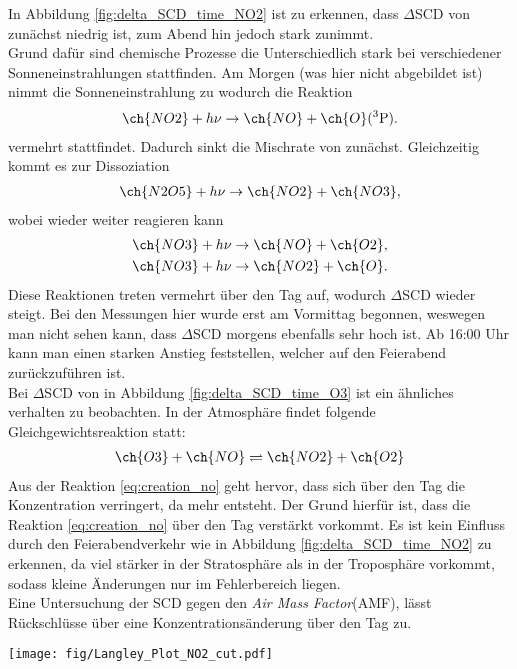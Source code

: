 \documentclass[12pt, a4paper, bibliography=totoc]{scrartcl}
\begin{document}
\begin{multicols}{2}
In Abbildung \ref{fig:delta_SCD_time_NO2} ist zu erkennen, dass $\Delta$SCD von  zunächst niedrig ist, zum Abend hin jedoch stark zunimmt.\\
Grund dafür sind chemische Prozesse die Unterschiedlich stark bei verschiedener Sonneneinstrahlungen stattfinden.
Am Morgen (was hier nicht abgebildet ist) nimmt die Sonneneinstrahlung zu wodurch die Reaktion
\begin{align}
    \ch{NO2} + h \nu \to \ch{NO} + \ch{O} (^3\text{P}). \label{eq:creation_no}
\end{align}
vermehrt stattfindet.
Dadurch sinkt die Mischrate von  zunächst.
Gleichzeitig kommt es zur Dissoziation 
\begin{align}
    \ch{N2O5} + h\nu \to \ch{NO2} + \ch{NO3},
\end{align}
wobei  wieder weiter reagieren kann
\begin{align}
    \ch{NO3} + h\nu \to \ch{NO} + \ch{O2}, \\
    \ch{NO3} + h\nu \to \ch{NO2} + \ch{O}.
\end{align}
Diese Reaktionen treten vermehrt über den Tag auf, wodurch $\Delta$SCD wieder steigt. 
Bei den Messungen hier wurde erst am Vormittag begonnen, weswegen man nicht sehen kann, dass $\Delta$SCD morgens ebenfalls sehr hoch ist.
Ab 16:00 Uhr kann man einen starken Anstieg feststellen, welcher auf den Feierabend zurückzuführen ist.\\
Bei $\Delta$SCD von  in Abbildung \ref{fig:delta_SCD_time_O3} ist ein ähnliches verhalten zu beobachten.
In der Atmosphäre findet folgende Gleichgewichtsreaktion statt:
\begin{align}
    \ch{O3} + \ch{NO} \rightleftharpoons \ch{NO2} + \ch{O2}
\end{align}
Aus der Reaktion \ref{eq:creation_no} geht hervor, dass sich über den Tag die  Konzentration verringert, da mehr  entsteht.
Der Grund hierfür ist, dass die Reaktion \ref{eq:creation_no} über den Tag verstärkt vorkommt.
Es ist kein Einfluss durch den Feierabendverkehr wie in Abbildung \ref{fig:delta_SCD_time_NO2} zu erkennen, da  viel stärker in der Stratosphäre als in der Troposphäre vorkommt, sodass kleine  Änderungen nur im Fehlerbereich liegen.
\\
Eine Untersuchung der SCD gegen den \textit{Air Mass Factor}(AMF), lässt Rückschlüsse über eine Konzentrationsänderung über den Tag zu.

\begin{center}
	\texttt{[image: fig/Langley\_Plot\_NO2\_cut.pdf]}
	\label{fig:langley_NO2}
\end{center}


\end{multicols}
\end{document}

